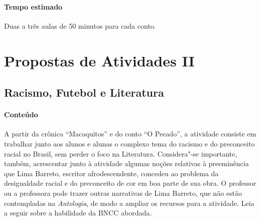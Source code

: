 \documentclass[11pt]{extarticle}
\begin{document}
\paragraph{Tempo estimado} Duas a três aulas de 50 minutos para cada conto.

\section{Propostas de Atividades II}


\subsection{Racismo, Futebol e Literatura}



\paragraph{Conteúdo} A partir da crônica ``Macaquitos'' e do
conto ``O Pecado'', a atividade consiste em trabalhar junto
aos alunos e alunas o complexo tema do racismo e do preconceito racial
no Brasil, sem perder o foco na Literatura. Considera"-se
importante, também, acrescentar junto à atividade algumas noções
relativas à preeminência que Lima Barreto, escritor afrodescendente,
concedeu ao problema da desigualdade racial e do preconceito de cor em
boa parte de sua obra. O professor ou a professora pode trazer outras
narrativas de Lima Barreto, que não estão contempladas na
\emph{Antologia}, de modo a ampliar os recursos para a atividade.
Leia a seguir sobre a habilidade da BNCC abordada.



\end{document}
